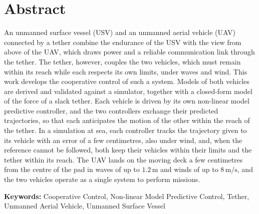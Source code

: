 
\section*{Abstract}


An unmanned surface vessel (USV) and an unmanned aerial vehicle (UAV) connected by a tether combine the endurance of the USV with the view from above of the UAV, which draws power and a reliable communication link through the tether. The tether, however, couples the two vehicles, which must remain within its reach while each respects its own limits, under waves and wind. This work develops the cooperative control of such a system. Models of both vehicles are derived and validated against a simulator, together with a closed-form model of the force of a slack tether. Each vehicle is driven by its own non-linear model predictive controller, and the two controllers exchange their predicted trajectories, so that each anticipates the motion of the other within the reach of the tether. In a simulation at sea, each controller tracks the trajectory given to its vehicle with an error of a few centimetres, also under wind, and, when the reference cannot be followed, both keep their vehicles within their limits and the tether within its reach. The UAV lands on the moving deck a few centimetres from the centre of the pad in waves of up to $1.2\,\text{m}$ and winds of up to $8\,\text{m/s}$, and the two vehicles operate as a single system to perform missions.

\vfill

\textbf{\Large Keywords:} Cooperative Control, Non-linear Model Predictive Control, Tether, Unmanned Aerial Vehicle, Unmanned Surface Vessel

